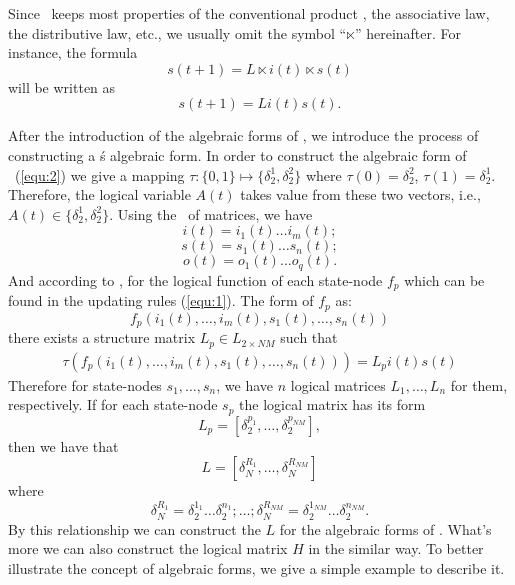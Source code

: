 Since \STP\ keeps most properties of the conventional product \cite{Cheng2011Analysis}, the associative law, the distributive law, etc., we usually omit the symbol ``$\ltimes$'' hereinafter. For instance, the 
formula \[s(t+1)=L\ltimes{i(t)}\ltimes{s(t)}\] will be written as  \[s(t+1)=L{i(t)}{s(t)}.\]

After the introduction of the algebraic forms of \BCNs, we introduce the process of constructing a \BCN\' s algebraic form. In order to construct the algebraic form of \BCN\ (\ref{equ:2}) we give a mapping $\tau:\{0,1\}\mapsto \{\delta_2^1, \delta_2^2\}$ where $\tau(0)=\delta_2^2$, $\tau(1)= \delta_2^1$. 
Therefore, the logical variable $A(t)$ takes value from these two vectors, i.e., $A(t)\in \{\delta_2^1, \delta_2^2\}$. Using the \STP\ of matrices, we have 
\[i(t)=i_1(t){\ldots}i_m(t);\] 
\[s(t)=s_1(t){\ldots}s_n(t);\] 
\[o(t)=o_1(t){\ldots}o_q(t).\] 
And according to \cite{Cheng2003Semi}, for the logical function of each state-node $f_p$ which can be found in the updating rules (\ref{equ:1}). The form of  $f_p$ as:
\[f_p(i_1(t),\ldots,i_m(t),s_1(t),\ldots,s_n(t))\] 
there exists a structure matrix $L_p\in L_{2\times {NM}}$ such that
\begin{equation}
\begin{split}
\tau(f_p(i_1(t),\ldots,i_m(t),s_1(t),\ldots,s_n(t)))= L_pi(t)s(t)
\end{split}
\end{equation}
Therefore for state-nodes $s_1,\ldots,s_n$, we have $n$ logical matrices $L_1,\ldots,L_n$ for them, respectively. 
If for each state-node $s_p$ the logical matrix has its form
\[L_p=[\delta_2^{p_1},\ldots,\delta_2^{p_{NM}}],\] 
then we have that %
\[L=[\delta_N^{R_1},\ldots,\delta_N^{R_{NM}}]\]  where 
\[\delta_N^{R_1}=\delta_2^{1_1}\ldots\delta_2^{n_1};\ldots; \delta_N^{R_{NM}}=\delta_2^{1_{NM}}\ldots\delta_2^{n_{NM}}.\] 
By this relationship we can construct the $L$ for the algebraic forms of \BCNs. What's more we can also construct the logical matrix $H$ in the similar way. To better illustrate the concept of algebraic forms, we give a simple example to describe it.
